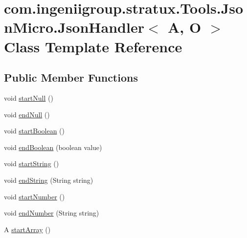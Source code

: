 \hypertarget{classcom_1_1ingeniigroup_1_1stratux_1_1_tools_1_1_json_micro_1_1_json_handler}{}\section{com.\+ingeniigroup.\+stratux.\+Tools.\+Json\+Micro.\+Json\+Handler$<$ A, O $>$ Class Template Reference}
\label{classcom_1_1ingeniigroup_1_1stratux_1_1_tools_1_1_json_micro_1_1_json_handler}
\subsection*{Public Member Functions}
\begin{DoxyCompactItemize}
\item 
void \hyperlink{classcom_1_1ingeniigroup_1_1stratux_1_1_tools_1_1_json_micro_1_1_json_handler_aed388437756c3880e84bffd35da6cc6d}{start\+Null} ()
\item 
void \hyperlink{classcom_1_1ingeniigroup_1_1stratux_1_1_tools_1_1_json_micro_1_1_json_handler_aa8096823d8b0aa7841be6eb213cf90cc}{end\+Null} ()
\item 
void \hyperlink{classcom_1_1ingeniigroup_1_1stratux_1_1_tools_1_1_json_micro_1_1_json_handler_abfc34f316f80d52368b046f1073d23f3}{start\+Boolean} ()
\item 
void \hyperlink{classcom_1_1ingeniigroup_1_1stratux_1_1_tools_1_1_json_micro_1_1_json_handler_a2b0cf30d38b4fe1b30224f2da6b1cf47}{end\+Boolean} (boolean value)
\item 
void \hyperlink{classcom_1_1ingeniigroup_1_1stratux_1_1_tools_1_1_json_micro_1_1_json_handler_a994bb1e2a71dedbec221b5d8d56e0d03}{start\+String} ()
\item 
void \hyperlink{classcom_1_1ingeniigroup_1_1stratux_1_1_tools_1_1_json_micro_1_1_json_handler_ae3111ade860fb1882621cfca98062ddb}{end\+String} (String string)
\item 
void \hyperlink{classcom_1_1ingeniigroup_1_1stratux_1_1_tools_1_1_json_micro_1_1_json_handler_aa092122e9575ce99623937237357ec14}{start\+Number} ()
\item 
void \hyperlink{classcom_1_1ingeniigroup_1_1stratux_1_1_tools_1_1_json_micro_1_1_json_handler_aa939647044a5d27c58b5a173cbab612d}{end\+Number} (String string)
\item 
A \hyperlink{classcom_1_1ingeniigroup_1_1stratux_1_1_tools_1_1_json_micro_1_1_json_handler_a573309df4295cb6a107c2936aa75bb85}{start\+Array} ()

\end{DoxyCompactItemize}
